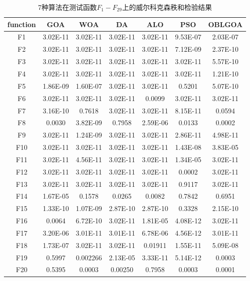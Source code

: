 \begin{table}[ht]
    \centering
    \caption{7种算法在测试函数$F_1-F_{29}$上的威尔科克森秩和检验结果}\label{tab:results_wilcoxon_rank_sum_test_IGOA}
    \renewcommand\arraystretch{1.3} 


    \begin{tabular}{*{7}{c}}
    \hline
    function&GOA&WOA&DA&ALO&PSO&OBLGOA\\
    \hline
 
    {F1}& 3.02E-11&3.02E-11&3.02E-11&3.02E-11&9.53E-07&2.03E-07\\\hline
    {F2}& 3.02E-11&3.02E-11&3.02E-11&3.02E-11&7.12E-09&2.37E-10\\\hline
    {F3}& 3.02E-11&3.02E-11&3.02E-11&3.02E-11&3.02E-11&5.57E-10\\\hline
    {F4}& 3.02E-11&3.02E-11&3.02E-11&3.02E-11&3.02E-11&1.21E-10\\\hline
    {F5}& 1.86E-09&1.60E-07&3.02E-11&3.02E-11&0.5201&5.07E-10\\\hline
    {F6}& 3.02E-11&3.02E-11&3.02E-11&0.0099&3.02E-11&3.02E-11\\\hline
    {F7}& 3.16E-10&0.7618&3.02E-11&3.02E-11&8.15E-11&0.0594\\\hline
    {F8}& 0.0030&3.82E-09&0.7958&2.59E-06&0.0133&0.0002\\\hline
    {F9}& 3.02E-11&1.24E-09&3.02E-11&3.02E-11&2.86E-11&4.98E-11\\\hline
    {F10}& 3.02E-11&3.02E-11&3.02E-11&3.02E-11&1.43E-08&3.83E-05\\\hline
    {F11}& 3.02E-11&4.56E-11&3.02E-11&3.02E-11&1.34E-05&3.02E-11\\\hline
    {F12}& 3.02E-11&3.02E-11&3.02E-11&3.02E-11&0.0002&3.02E-11\\\hline
    {F13}& 3.02E-11&3.02E-11&3.02E-11&3.02E-11&0.9117&3.02E-11\\\hline
    {F14}& 1.67E-05&0.1578&0.0265&0.0082&0.7842&0.6951\\\hline
    {F15}& 1.33E-10&1.07E-09&2.87E-10&2.87E-10&0.3328&2.15E-10\\\hline
    {F16}& 0.0064&6.72E-10&3.02E-11&1.81E-05&4.08E-12&3.02E-11\\\hline
    {F17}& 3.20E-06&3.01E-11&3.01E-11&6.78E-06&4.56E-12&3.01E-11\\\hline
    {F18}& 1.73E-07&3.02E-11&3.02E-11&0.01911&1.55E-11&5.09E-08\\\hline
    {F19}& 0.5997&0.002266&2.13E-05&3.33E-11&5.14E-12&0.0003\\\hline
    {F20}& 0.5395&0.0003&0.00250&0.7958&0.0003&0.0001\\\hline
    \end{tabular}
\end{table}
